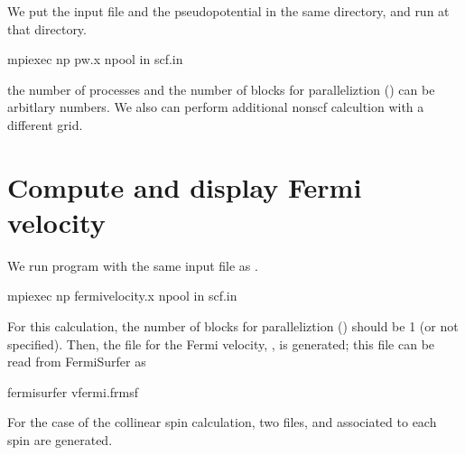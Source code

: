 \documentclass[letterpaper,10pt,pdftex,openany,english]{sphinxmanual}
\begin{document}
\sphinxAtStartPar
We put the input file and the pseudopotential in the same directory,
and run  at that directory.

\begin{sphinxVerbatim}[commandchars=\\\{\}]
\PYGZdl{} mpiexec \PYGZhy{}np  pw.x \PYGZhy{}npool  \PYGZhy{}in scf.in
\end{sphinxVerbatim}

\sphinxAtStartPar
the number of processes and the number of blocks for \sphinxhyphen{}paralleliztion ()
can be arbitlary numbers.
We also can perform additional non\sphinxhyphen{}scf calcultion with a different \sphinxhyphen{}grid.


\section{Compute and display Fermi velocity}
\label{\detokenize{qe:compute-and-display-fermi-velocity}}
\sphinxAtStartPar
We run  program with the same input file as .

\begin{sphinxVerbatim}[commandchars=\\\{\}]
\PYGZdl{} mpiexec \PYGZhy{}np  fermi\PYGZus{}velocity.x \PYGZhy{}npool  \PYGZhy{}in scf.in
\end{sphinxVerbatim}

\sphinxAtStartPar
For this calculation, the number of blocks for \sphinxhyphen{}paralleliztion ()
should be 1 (or not specified).
Then, the file for the Fermi velocity, , is generated;
this file can be read from FermiSurfer as

\begin{sphinxVerbatim}[commandchars=\\\{\}]
\PYGZdl{} fermisurfer vfermi.frmsf
\end{sphinxVerbatim}

\begin{figure}[htbp]
\centering

\noindent{}
\end{figure}

\sphinxAtStartPar
For the case of the collinear spin calculation,
two files,  and  associated
to each spin are generated.
\end{document}
